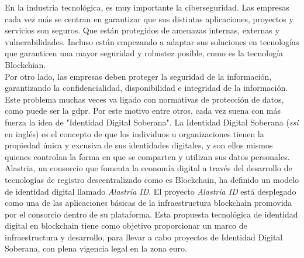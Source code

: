 
        En la industria tecnológica, es muy importante la ciberseguridad. Las empresas cada vez más se centran en garantizar que sus distintas aplicaciones, proyectos y servicios son seguros. Que están protegidos de amenazas internas, externas y vulnerabilidades. Incluso están empezando a adaptar sus soluciones en tecnologías que garanticen una mayor seguridad y robustez posible, como es la tecnología Blockchian.\\
        
        Por otro lado, las empresas deben proteger la seguridad de la información, garantizando la confidencialidad, disponibilidad e integridad de la información. Este problema muchas veces va ligado con normativas de protección de datos, como puede ser la \acrshort{gdpr}. Por este motivo entre otros, cada vez suena con más fuerza la idea de "Identidad Digital Soberana". La Identidad Digital Soberana (\textit{\acrlong{ssi}} en inglés) es el concepto de que los individuos u organizaciones tienen la propiedad única y excusiva de sus identidades digitales, y son ellos mismos quienes controlan la forma en que se comparten y utilizan sus datos personales.\\
        
        Alastria, un consorcio que fomenta la economía digital a través del desarrollo de tecnologías de registro descentralizado como es Blockchain, ha definido un modelo de identidad digital llamado \textit{Alastria ID}. El proyecto \textit{Alastria ID} está desplegado como una de las aplicaciones básicas de la infraestructura blockchain promovida por el consorcio dentro de su plataforma. Esta propuesta tecnológica de identidad digital en blockchain tiene como objetivo proporcionar un marco de infraestructura y desarrollo, para llevar a cabo proyectos de Identidad Digital Soberana, con plena vigencia legal en la zona euro.\\
        
        

